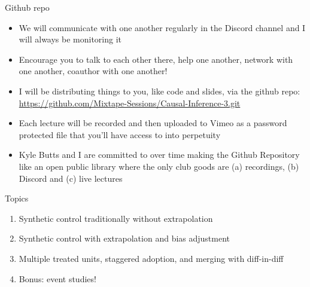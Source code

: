 \documentclass{beamer}
\begin{document}





\begin{frame}{Github repo}

  \begin{itemize}
    \item We will communicate with one another regularly in the Discord channel and I will always be monitoring it
    \item Encourage you to talk to each other there, help one another, network with one another, coauthor with one another!
    \item I will be distributing things to you, like code and slides, via the github repo: \url{https://github.com/Mixtape-Sessions/Causal-Inference-3.git}
    \item Each lecture will be recorded and then uploaded to Vimeo as a password protected file that you'll have access to into perpetuity
    \item Kyle Butts and I are committed to over time making the Github Repository like an open public library where the only club goods are (a) recordings, (b) Discord and (c) live lectures
  \end{itemize}

\end{frame}

\begin{frame}{Topics}

  \begin{enumerate}
    \item Synthetic control traditionally without extrapolation
    \item Synthetic control with extrapolation and bias adjustment
    \item Multiple treated units, staggered adoption, and merging with diff-in-diff
	\item Bonus: event studies!
  \end{enumerate}

\end{frame}
\end{document}

